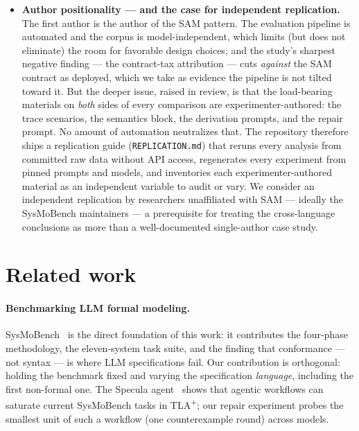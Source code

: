\documentclass[11pt]{article}
\newcommand{\tlaplus}{TLA\texorpdfstring{\textsuperscript{+}}{+}}
\begin{document}
\begin{itemize}
  (see above --- the one gap that, once filled, changed a conclusion);
  \emph{multi-round repair} is now run (Haiku does not converge;
  \S\ref{sec:repair}); the \emph{as-deployed agent-mediated \tlaplus{}
  Phase 3} remains unrun --- it reintroduces the very confound the direct
  replay removed, and belongs in a separate agent-capability study;
  \emph{other vendors} remain blocked on credentials (the registry entries
  exist in \texttt{config/models.yaml}; only Anthropic keys are available
  in this environment); and the \emph{factorial on \texttt{locksvc}}
  remains open (the lean arms exist; the SAM and \tlaplus{} arms need
  locksvc prompts and a locksvc TLC replay module). Each is inventoried
  with run instructions in \texttt{REPLICATION.md}.
\item \textbf{Author positionality --- and the case for independent
  replication.} The first author is the author of the SAM pattern. The
  evaluation pipeline is automated and the corpus is model-independent,
  which limits (but does not eliminate) the room for favorable design
  choices; and the study's sharpest negative finding --- the contract-tax
  attribution --- cuts \emph{against} the SAM contract as deployed, which
  we take as evidence the pipeline is not tilted toward it. But the deeper
  issue, raised in review, is that the load-bearing materials on
  \emph{both} sides of every comparison are experimenter-authored: the
  trace scenarios, the semantics block, the derivation prompts, and the
  repair prompt. No amount of automation neutralizes that. The repository
  therefore ships a replication guide (\texttt{REPLICATION.md}) that
  reruns every analysis from committed raw data without API access,
  regenerates every experiment from pinned prompts and models, and
  inventories each experimenter-authored material as an independent
  variable to audit or vary. We consider an independent replication by
  researchers unaffiliated with SAM --- ideally the SysMoBench
  maintainers --- a prerequisite for treating the cross-language
  conclusions as more than a well-documented single-author case study.
\end{itemize}

\section{Related work}
\label{sec:related}

\paragraph{Benchmarking LLM formal modeling.}
SysMoBench~\cite{sysmobench,sigops2026} is the direct foundation of this
work: it contributes the four-phase methodology, the eleven-system task
suite, and the finding that conformance --- not syntax --- is where LLM
specifications fail. Our contribution is orthogonal: holding the benchmark
fixed and varying the specification \emph{language}, including the first
non-formal one. The Specula agent~\cite{specula} shows that agentic
workflows can saturate current SysMoBench tasks in \tlaplus{}; our repair
experiment probes the smallest unit of such a workflow (one counterexample
round) across models.
\end{document}
